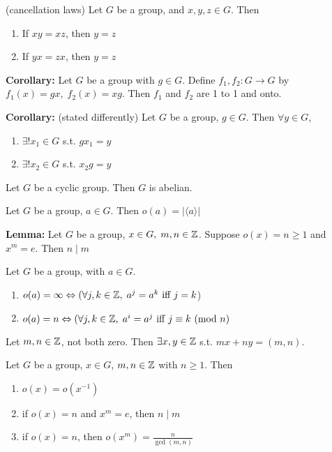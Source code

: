 \pagebreak
\prop (cancellation laws) Let $G$ be a group, and $x, y, z \in G$. Then 
\begin{enumerate}
    \item If $xy = xz$, then $y = z$
    \item If $yx = zx$, then $y = z$
\end{enumerate}

\bigskip 

\noindent 
\textbf{Corollary:} Let $G$ be a group with $g \in G$. Define $f_1, f_2: G \rightarrow G$ by $f_1(x) = gx,\; f_2(x) = xg$. Then $f_1$ and $f_2$ are 1 to 1 and onto.

\bigskip 

\noindent 
\textbf{Corollary:} (stated differently) Let $G$ be a group, $g \in G$. Then $\forall y \in G$,
\begin{enumerate}
    \item $\exists! x_1 \in G$ s.t. $gx_1 = y$
    \item $\exists! x_2 \in G$ s.t. $x_2g = y$
\end{enumerate} 

\thm Let $G$ be a cyclic group. Then $G$ is abelian.

\thm Let $G$ be a group, $a \in G$. Then $o(a) = |\langle a \rangle|$

\bigskip 

\noindent 
\textbf{Lemma:} Let $G$ be a group, $x \in G, \; m, n \in \mathbb{Z}$. Suppose $o(x) = n \ge 1$ and $x^m = e$. Then $n \mid m$

\prop Let $G$ be a group, with $a \in G$. 
\begin{enumerate}
    \item $o(a) = \infty \Leftrightarrow (\forall j, k \in \mathbb{Z}, \; a^j=a^k \text{ iff } j=k$)
    \item $o(a) = n \Leftrightarrow (\forall j, k \in \mathbb{Z}, \; a^i=a^j \text{ iff } j \equiv k \text{ (mod } n)$
\end{enumerate}

\thm Let $m, n \in \mathbb{Z}$, not both zero. Then $\exists x, y \in \mathbb{Z}$ s.t. $mx + ny = (m, n)$.

\thm Let $G$ be a group, $x \in G$, $m, n \in \mathbb{Z}$ with $n \ge 1$. Then 
\begin{enumerate}
    \item $o(x) = o(x^{-1})$
    \item if $o(x) = n$ and $x^m = e$, then $n \mid m$
    \item if $o(x) = n$, then $o(x^m) = \frac{n}{\gcd(m, n)}$
\end{enumerate}

